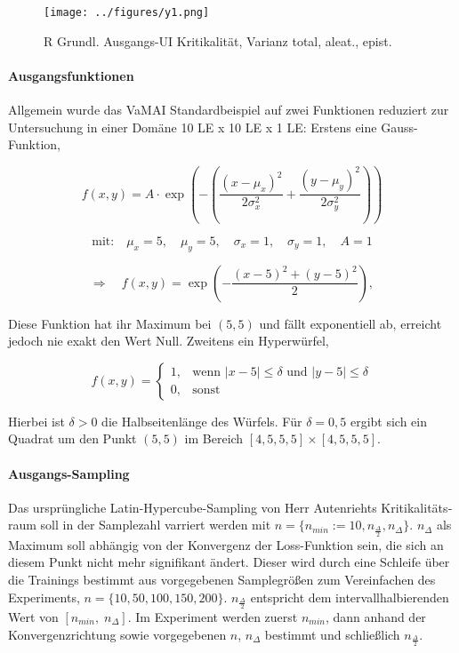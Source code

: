 \begin{otherlanguage}{ngerman}
\begin{figure}[!ht]
  \centering
  \texttt{[image: ../figures/y1.png]}
  \caption{R Grundl. Ausgangs-UI Kritikalität, Varianz total, aleat., epist.}
\end{figure}

\paragraph{Ausgangsfunktionen} Allgemein wurde das VaMAI Standardbeispiel auf zwei Funktionen reduziert zur Untersuchung in einer Domäne 10 LE x 10 LE x 1 LE: Erstens eine Gauss-Funktion, 

\[
f(x, y) = A \cdot \exp\left( -\left( \frac{(x - \mu_x)^2}{2\sigma_x^2} + \frac{(y - \mu_y)^2}{2\sigma_y^2} \right) \right)
\]

\[
\text{mit:} \quad \mu_x = 5,\quad \mu_y = 5,\quad \sigma_x = 1,\quad \sigma_y = 1,\quad A = 1
\]

\[
\Rightarrow \quad f(x, y) = \exp\left( -\frac{(x - 5)^2 + (y - 5)^2}{2} \right),
\]

Diese Funktion hat ihr Maximum bei $(5, 5)$ und fällt exponentiell ab, erreicht jedoch nie exakt den Wert Null. Zweitens ein Hyperwürfel,

\[
f(x, y) =
\begin{cases}
1, & \text{wenn } |x - 5| \leq \delta \text{ und } |y - 5| \leq \delta \\
0, & \text{sonst}
\end{cases}
\]

Hierbei ist $\delta > 0$ die Halbseitenlänge des Würfels. Für $\delta = 0{,}5$ ergibt sich ein Quadrat um den Punkt $(5, 5)$ im Bereich $[4{,}5, 5{,}5] \times [4{,}5, 5{,}5]$.

\paragraph{Ausgangs-Sampling} Das ursprüngliche Latin-Hypercube-Sampling von Herr Autenriehts Kritikalitätsraum soll in der Samplezahl varriert werden mit $n = \{ n_{min} := 10, n_{\frac{\Delta}{2}}, n_{\Delta} \}$. $n_{\Delta}$ als Maximum soll abhängig von der Konvergenz der Loss-Funktion sein, die sich an diesem Punkt nicht mehr signifikant ändert. Dieser wird durch eine Schleife über die Trainings bestimmt aus vorgegebenen Samplegrößen zum Vereinfachen des Experiments, $n = \{ 10, 50, 100, 150, 200 \}$. $n_{\frac{\Delta}{2}}$ entspricht dem intervallhalbierenden Wert von $\left[ n_{min},\; n_{\Delta} \right]$. Im Experiment werden zuerst $n_{min}$, dann anhand der Konvergenzrichtung sowie vorgegebenen $n$, $n_{\Delta}$ bestimmt und schließlich $n_{\frac{\Delta}{2}}$.


\end{otherlanguage}
